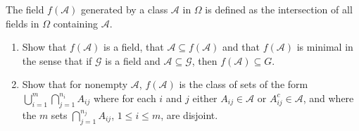 \documentclass[11pt]{article}
\newcommand{\A}{\mathcal{A}}
\newcommand{\G}{\mathcal{G}}
\newcommand{\seq}{\subseteq}
\newcommand{\Om}{\Omega}
\newenvironment{exercise}[2][Exercise]{\begin{trivlist}
\item[\hskip \labelsep {\bfseries #1}\hskip \labelsep {\bfseries #2.}]}{\end{trivlist}}
\begin{document}
\begin{exercise}{2.5}
    The field $f (\A)$ generated by a class $\A$ in $\Om$ is defined as the intersection of all fields in $\Om$ containing $\A$.
    \begin{enumerate}
        \item Show that $f(\A)$ is a field, that $\A \seq f(\A)$ and that $f(\A)$ is minimal in the sense that if $\G$ is a field and $\A \seq \G$, then $f(\A) \seq G$.
        \item Show that for nonempty $\A$, $f(\A)$ is the class of sets of the form $\bigcup_{i=1}^{m} \bigcap_{j=1}^{n_i} A_{ij}$ where for each $i$ and $j$ either $A_{ij} \in \A$ or $A_{ij}^{c} \in \A$, and where the $m$ sets $\bigcap_{j=1}^{n_j} A_{ij}$, $1 \leq i \leq m$, are disjoint.
    \end{enumerate}
\end{exercise}
\end{document}
